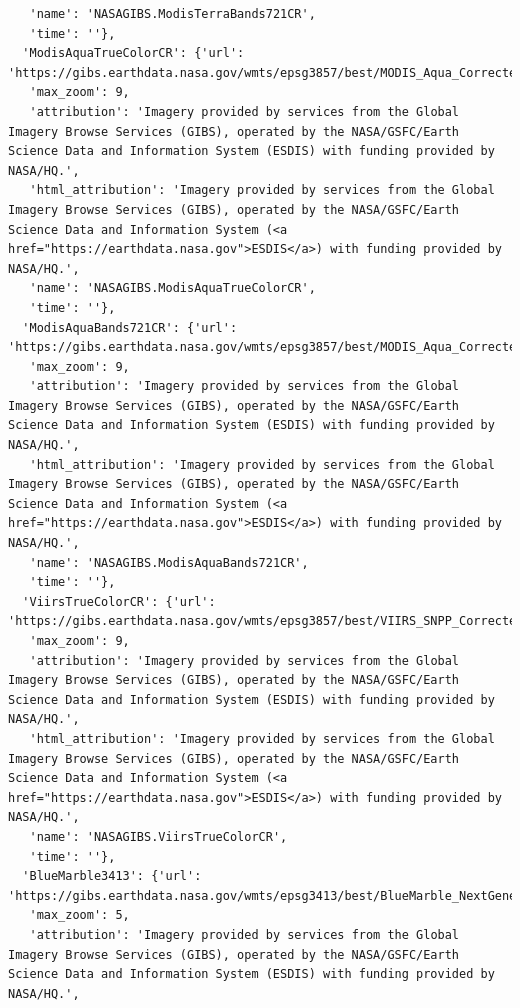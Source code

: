 \documentclass[
  letterpaper,
  DIV=11,
  numbers=noendperiod]{scrreprt}
\begin{document}
\begin{verbatim}
   'name': 'NASAGIBS.ModisTerraBands721CR',
   'time': ''},
  'ModisAquaTrueColorCR': {'url': 'https://gibs.earthdata.nasa.gov/wmts/epsg3857/best/MODIS_Aqua_CorrectedReflectance_TrueColor/default/{time}/GoogleMapsCompatible_Level9/{z}/{y}/{x}.jpg',
   'max_zoom': 9,
   'attribution': 'Imagery provided by services from the Global Imagery Browse Services (GIBS), operated by the NASA/GSFC/Earth Science Data and Information System (ESDIS) with funding provided by NASA/HQ.',
   'html_attribution': 'Imagery provided by services from the Global Imagery Browse Services (GIBS), operated by the NASA/GSFC/Earth Science Data and Information System (<a href="https://earthdata.nasa.gov">ESDIS</a>) with funding provided by NASA/HQ.',
   'name': 'NASAGIBS.ModisAquaTrueColorCR',
   'time': ''},
  'ModisAquaBands721CR': {'url': 'https://gibs.earthdata.nasa.gov/wmts/epsg3857/best/MODIS_Aqua_CorrectedReflectance_Bands721/default/{time}/GoogleMapsCompatible_Level9/{z}/{y}/{x}.jpg',
   'max_zoom': 9,
   'attribution': 'Imagery provided by services from the Global Imagery Browse Services (GIBS), operated by the NASA/GSFC/Earth Science Data and Information System (ESDIS) with funding provided by NASA/HQ.',
   'html_attribution': 'Imagery provided by services from the Global Imagery Browse Services (GIBS), operated by the NASA/GSFC/Earth Science Data and Information System (<a href="https://earthdata.nasa.gov">ESDIS</a>) with funding provided by NASA/HQ.',
   'name': 'NASAGIBS.ModisAquaBands721CR',
   'time': ''},
  'ViirsTrueColorCR': {'url': 'https://gibs.earthdata.nasa.gov/wmts/epsg3857/best/VIIRS_SNPP_CorrectedReflectance_TrueColor/default/{time}/GoogleMapsCompatible_Level9/{z}/{y}/{x}.jpg',
   'max_zoom': 9,
   'attribution': 'Imagery provided by services from the Global Imagery Browse Services (GIBS), operated by the NASA/GSFC/Earth Science Data and Information System (ESDIS) with funding provided by NASA/HQ.',
   'html_attribution': 'Imagery provided by services from the Global Imagery Browse Services (GIBS), operated by the NASA/GSFC/Earth Science Data and Information System (<a href="https://earthdata.nasa.gov">ESDIS</a>) with funding provided by NASA/HQ.',
   'name': 'NASAGIBS.ViirsTrueColorCR',
   'time': ''},
  'BlueMarble3413': {'url': 'https://gibs.earthdata.nasa.gov/wmts/epsg3413/best/BlueMarble_NextGeneration/default/EPSG3413_500m/{z}/{y}/{x}.jpeg',
   'max_zoom': 5,
   'attribution': 'Imagery provided by services from the Global Imagery Browse Services (GIBS), operated by the NASA/GSFC/Earth Science Data and Information System (ESDIS) with funding provided by NASA/HQ.',

\end{verbatim}
\end{document}
